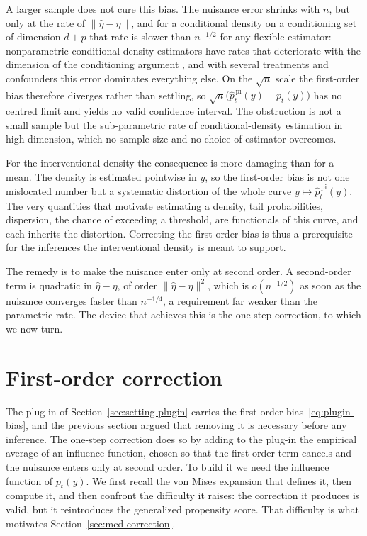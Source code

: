 \documentclass[11pt]{article}
\theoremstyle{plain}
\theoremstyle{definition}
\theoremstyle{remark}
\begin{document}
A larger sample does not cure this bias. The nuisance error shrinks with $n$, but only at the
rate of $\|\widehat\eta-\eta\|$, and for a conditional density on a conditioning set of
dimension $d+p$ that rate is slower than $n^{-1/2}$ for any flexible estimator: nonparametric
conditional-density estimators have rates that deteriorate with the dimension of the
conditioning argument \citep{stone1980,Tsybakov2009NonparametricEstimation,bashtannyk2001,hall2004},
and with several treatments and confounders this error dominates everything else. On the
$\sqrt n$ scale the first-order bias therefore diverges
rather than settling, so $\sqrt n\big(\widehat p^{\,\mathrm{pi}}_t(y)-p_t(y)\big)$ has no
centred limit and yields no valid confidence interval. The obstruction is not a small sample
but the sub-parametric rate of conditional-density estimation in high dimension, which no
sample size and no choice of estimator overcomes.

For the interventional density the consequence is more damaging than for a mean. The density
is estimated pointwise in $y$, so the first-order bias is not one mislocated number but a
systematic distortion of the whole curve $y\mapsto\widehat p^{\,\mathrm{pi}}_t(y)$. The very quantities that
motivate estimating a density, tail probabilities, dispersion, the chance of exceeding a
threshold, are functionals of this curve, and each inherits the distortion. Correcting the
first-order bias is thus a prerequisite for the inferences the interventional density is meant
to support.

The remedy is to make the nuisance enter only at second order. A second-order term is
quadratic in $\widehat\eta-\eta$, of order $\|\widehat\eta-\eta\|^2$, which is $o(n^{-1/2})$ as
soon as the nuisance converges faster than $n^{-1/4}$, a requirement far weaker than the
parametric rate. The device that achieves this is the one-step correction, to which we now
turn.

\section{First-order correction}
\label{sec:eif}

The plug-in of Section~\ref{sec:setting-plugin} carries the first-order
bias~\eqref{eq:plugin-bias}, and the previous section argued that removing it is necessary
before any inference. The one-step correction does so by adding to the plug-in the empirical
average of an influence function, chosen so that the first-order term cancels and the nuisance
enters only at second order. To build it we need the influence function of $p_t(y)$. We first
recall the von Mises expansion that defines it, then compute it, and then confront the
difficulty it raises: the correction it produces is valid, but it reintroduces the generalized
propensity score. That difficulty is what motivates Section~\ref{sec:mcd-correction}.
\end{document}
